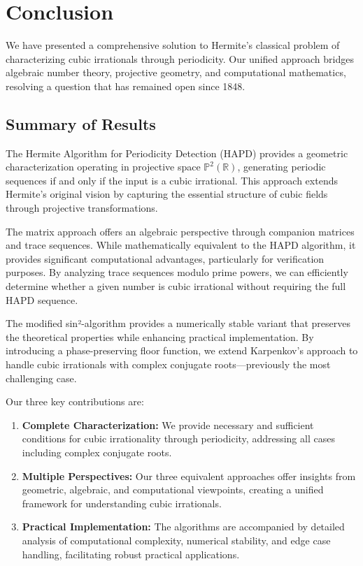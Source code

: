 \section{Conclusion}\label{sec:conclusion}

We have presented a comprehensive solution to Hermite's classical problem of characterizing cubic irrationals through periodicity. Our unified approach bridges algebraic number theory, projective geometry, and computational mathematics, resolving a question that has remained open since 1848.

\subsection{Summary of Results}

The Hermite Algorithm for Periodicity Detection (HAPD) provides a geometric characterization operating in projective space $\mathbb{P}^2(\mathbb{R})$, generating periodic sequences if and only if the input is a cubic irrational. This approach extends Hermite's original vision by capturing the essential structure of cubic fields through projective transformations.

The matrix approach offers an algebraic perspective through companion matrices and trace sequences. While mathematically equivalent to the HAPD algorithm, it provides significant computational advantages, particularly for verification purposes. By analyzing trace sequences modulo prime powers, we can efficiently determine whether a given number is cubic irrational without requiring the full HAPD sequence.

The modified sin²-algorithm provides a numerically stable variant that preserves the theoretical properties while enhancing practical implementation. By introducing a phase-preserving floor function, we extend Karpenkov's approach to handle cubic irrationals with complex conjugate roots—previously the most challenging case.

Our three key contributions are:
\begin{enumerate}
\item \textbf{Complete Characterization:} We provide necessary and sufficient conditions for cubic irrationality through periodicity, addressing all cases including complex conjugate roots.
\item \textbf{Multiple Perspectives:} Our three equivalent approaches offer insights from geometric, algebraic, and computational viewpoints, creating a unified framework for understanding cubic irrationals.
\item \textbf{Practical Implementation:} The algorithms are accompanied by detailed analysis of computational complexity, numerical stability, and edge case handling, facilitating robust practical applications.
\end{enumerate}

